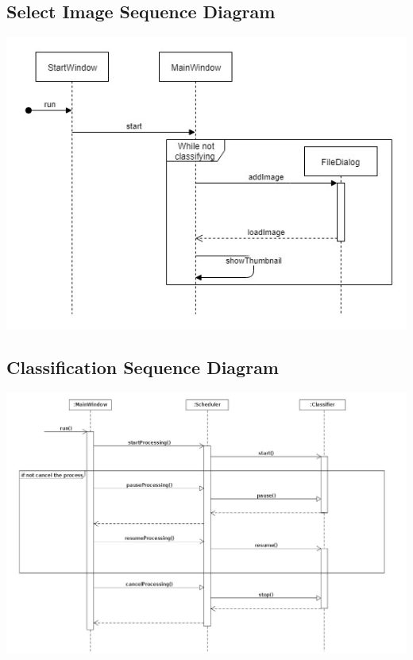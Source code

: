 \documentclass[parskip=full]{scrartcl}
\begin{document}
\begin{itemize}
\subsection {Select Image Sequence Diagram}

\begin{center}
\includegraphics[width=1.0\textwidth]{SelectImageSeqDiag.jpg}
\end{center}

\pagebreak

\subsection {Classification Sequence Diagram}

\begin{center}
\includegraphics[width=1.0\textwidth]{Classification.jpg}
\end{center}


\end{itemize}
\end{document}
